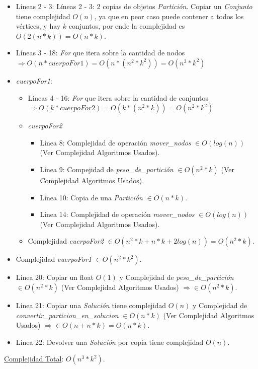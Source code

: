 \documentclass[10pt,a4paper]{article}
\begin{document}
\begin{itemize}
\item Líneas 2 - 3: Líneas 2 - 3: 2 copias de objetos \textit{Partición}. Copiar un \textit{Conjunto} tiene complejidad $O(n)$, ya que en peor caso puede contener a todos los vértices, y hay $k$ conjuntos, por ende la complejidad es $O(2(n*k)) = O(n*k)$.
\item Líneas 3 - 18: \textit{For} que itera sobre la cantidad de nodos $\Rightarrow O(n * cuerpoFor1) = O(n*(n^2*k^2)) = O(n^3*k^2) $
\item \textit{cuerpoFor1}:
\begin{itemize}
\item Líneas 4 - 16: \textit{For} que itera sobre la cantidad de conjuntos $\Rightarrow O(k * cuerpoFor2) = O(k*(n^2*k)) = O(n^2*k^2)$
\item \textit{cuerpoFor2}
\begin{itemize}
\item Línea 8: Complejidad de operación \textit{mover\_nodos} $\in O(log(n))$ (Ver Complejidad Algoritmos Usados).
\item Línea 9: Compejidad de \textit{peso\_de\_partición} $\in O(n^2*k)$ (Ver Complejidad Algoritmos Usados).
\item Línea 10: Copia de una \textit{Partición} $\in O(n*k)$.
\item Línea 14: Complejidad de operación \textit{mover\_nodos} $\in O(log(n))$ (Ver Complejidad Algoritmos Usados).
\end{itemize}
\item Complejidad \textit{cuerpoFor2} $\in O(n^2*k + n*k + 2log(n)) = O(n^2*k)$.
\end{itemize}
\item Complejidad \textit{cuerpoFor1} $\in O(n^2*k^2)$.
\item Línea 20: Copiar un float $O(1)$ y Complejidad de \textit{peso\_de\_partición} $\in O(n^2*k)$ (Ver Complejidad Algoritmos Usados) $\Rightarrow \in O(n^2*k)$.
\item Línea 21: Copiar una \textit{Solución} tiene complejidad $O(n)$ y Complejidad de \textit{convertir\_particion\_en\_solucion} $\in O(n*k)$ (Ver Complejidad Algoritmos Usados) $\Rightarrow \in O(n + n*k) = O(n*k)$.
\item Línea 22: Devolver una \textit{Solución} por copia tiene complejidad $O(n)$.
\end{itemize}

\underline{Complejidad Total}: $O(n^3*k^2)$.
\end{document}
